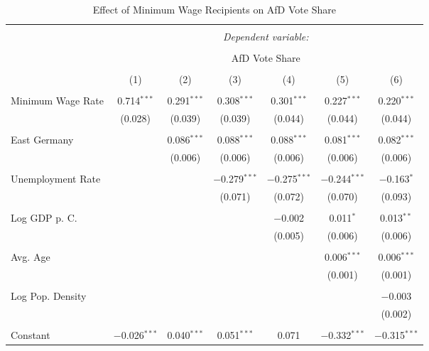 
\begin{table}[!htbp] \centering 
  \caption{Effect of Minimum Wage Recipients on AfD Vote Share} 
  \label{} 
\begin{tabular}{@{\extracolsep{5pt}}lcccccc} 
\\[-1.8ex]\hline 
\hline \\[-1.8ex] 
 & \multicolumn{6}{c}{\textit{Dependent variable:}} \\ 
\cline{2-7} 
\\[-1.8ex] & \multicolumn{6}{c}{AfD Vote Share} \\ 
\\[-1.8ex] & (1) & (2) & (3) & (4) & (5) & (6)\\ 
\hline \\[-1.8ex] 
 Minimum Wage Rate & 0.714$^{***}$ & 0.291$^{***}$ & 0.308$^{***}$ & 0.301$^{***}$ & 0.227$^{***}$ & 0.220$^{***}$ \\ 
  & (0.028) & (0.039) & (0.039) & (0.044) & (0.044) & (0.044) \\ 
  & & & & & & \\ 
 East Germany &  & 0.086$^{***}$ & 0.088$^{***}$ & 0.088$^{***}$ & 0.081$^{***}$ & 0.082$^{***}$ \\ 
  &  & (0.006) & (0.006) & (0.006) & (0.006) & (0.006) \\ 
  & & & & & & \\ 
 Unemployment Rate &  &  & $-$0.279$^{***}$ & $-$0.275$^{***}$ & $-$0.244$^{***}$ & $-$0.163$^{*}$ \\ 
  &  &  & (0.071) & (0.072) & (0.070) & (0.093) \\ 
  & & & & & & \\ 
 Log GDP p. C. &  &  &  & $-$0.002 & 0.011$^{*}$ & 0.013$^{**}$ \\ 
  &  &  &  & (0.005) & (0.006) & (0.006) \\ 
  & & & & & & \\ 
 Avg. Age &  &  &  &  & 0.006$^{***}$ & 0.006$^{***}$ \\ 
  &  &  &  &  & (0.001) & (0.001) \\ 
  & & & & & & \\ 
 Log Pop. Density &  &  &  &  &  & $-$0.003 \\ 
  &  &  &  &  &  & (0.002) \\ 
  & & & & & & \\ 
 Constant & $-$0.026$^{***}$ & 0.040$^{***}$ & 0.051$^{***}$ & 0.071 & $-$0.332$^{***}$ & $-$0.315$^{***}$ \\ 

\end{tabular}
\end{table}
